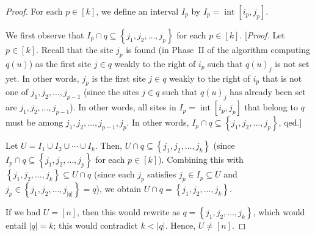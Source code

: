 \documentclass[reqno]{amsart}
\newcommand{\0}{\phantom{c}}
\DeclareMathOperator{\inter}{int} %
\newenvironment{verlong}{}{}
\newcommand{\set}[1]{\left\{ #1 \right\}}
\newcommand{\abs}[1]{\left| #1 \right|}
\newcommand{\ive}[1]{\left[ #1 \right]}
\theoremstyle{plain}
\theoremstyle{definition}
\numberwithin{equation}{section}
\begin{document}
\begin{verlong}
\begin{proof}
For each $p \in \ive{k}$, we define an interval $I_p$ by $I_p = \inter[i_p, j_p]$.

We first observe that $I_p \cap q \subseteq \set{j_1, j_2, \ldots, j_p}$
for each $p \in \ive{k}$.
[\textit{Proof.} Let $p \in \ive{k}$.
Recall that the site $j_p$ is found
(in Phase~II of the algorithm computing $q(u)$) as the first site $j \in q$ weakly to the right of $i_p$ such that $q(u)_j$ is not set yet.
In other words, $j_p$ is the first site $j \in q$ weakly to the right of $i_p$ that is not one of $j_1, j_2, \ldots, j_{p-1}$
(since the sites $j \in q$ such that $q(u)_j$ has already been set are $j_1, j_2, \ldots, j_{p-1}$).
In other words, all sites in $I_p = \inter[i_p, j_p]$ that belong to $q$ must be among $j_1, j_2, \ldots, j_{p-1}, j_p$.
In other words, $I_p \cap q \subseteq \set{j_1, j_2, \ldots, j_p}$, qed.]

Let $U = I_1 \cup I_2 \cup \cdots \cup I_k$.
Then, $U \cap q \subseteq \set{j_1, j_2, \ldots, j_k}$ (since $I_p \cap q \subseteq \set{j_1, j_2, \ldots, j_p}$ for each $p \in \ive{k}$).
Combining this with $\set{j_1, j_2, \ldots, j_k} \subseteq U \cap q$ (since each $j_p$ satisfies $j_p \in I_p \subseteq U$ and $j_p \in \set{j_1, j_2, \ldots, j_{\abs{q}}} = q$),
we obtain $U \cap q = \set{j_1, j_2, \ldots, j_k}$.

If we had $U = \ive{n}$, then this would rewrite as $q = \set{j_1, j_2, \ldots, j_k}$, which would entail $\abs{q} = k$; this would contradict $k < \abs{q}$.
Hence, $U \neq \ive{n}$.


\end{proof}
\end{verlong}
\end{document}
